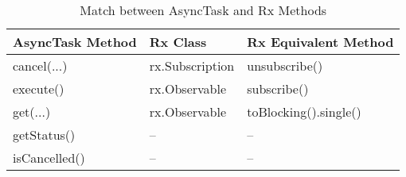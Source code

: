 \begin{table}[H]
\begin{center}
\begin{tabular}{|C{4cm}|C{4cm}|C{4cm}|}
\hline
\bf AsyncTask Method & \bf Rx Class & \bf Rx Equivalent Method\\\hline
cancel(...) & rx.Subscription & unsubscribe()\\
execute() & rx.Observable & subscribe()\\
get(...) & rx.Observable & toBlocking().single()\\
getStatus() & -- & --\\
isCancelled() & -- & --\\\hline
\end{tabular}
\end{center}
\caption{Match between AsyncTask and Rx Methods}
\label{table:asynctask-rx-methods}
\end{table}
